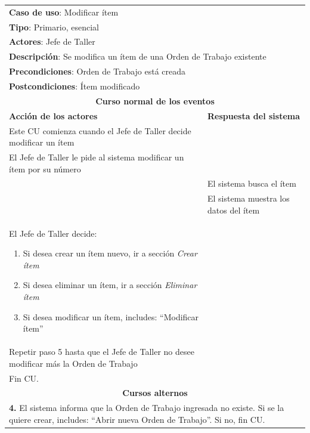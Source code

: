 \documentclass[12pt]{extarticle}
\begin{document}
\begin{spacing}{1.2}
	\begin{longtable}{ |p{8cm}|p{8cm}| }
		\hline
		\multicolumn{2}{|p{16cm}|}{\textbf{Caso de uso}: Modificar ítem}\\
		\multicolumn{2}{|p{16cm}|}{\textbf{Tipo}: Primario, esencial}\\
		\multicolumn{2}{|p{16cm}|}{\textbf{Actores}: Jefe de Taller}\\
		\multicolumn{2}{|p{16cm}|}{\textbf{Descripción}: Se modifica un ítem de una Orden de Trabajo existente}\\
		\multicolumn{2}{|p{16cm}|}{\textbf{Precondiciones}: Orden de Trabajo está creada}\\
		\multicolumn{2}{|p{16cm}|}{\textbf{Postcondiciones}: Ítem modificado}\\
		\hline
		\multicolumn{2}{|c|}{\textbf{Curso normal de los eventos}}\\
		\hline
		\textbf{Acción de los actores} & \textbf{Respuesta del sistema}\\
		\hline
			\inc Este CU comienza cuando el Jefe de Taller decide modificar un ítem& \\
			\hline
			\inc El Jefe de Taller le pide al sistema modificar un ítem por su número& \\
			\hline
			& \inc El sistema busca el ítem \\
			\hline
			& \inc El sistema muestra los datos del ítem\\
			\hline
			\inc El Jefe de Taller decide:
            \begin{enumerate}[label=(\alph*)]
                \item Si desea crear un ítem nuevo, ir a sección \textit{Crear ítem}
                \item Si desea eliminar un ítem, ir a sección \textit{Eliminar ítem}
                \item Si desea modificar un ítem, includes: ``Modificar ítem'' 
            \end{enumerate}        & \\
			\hline
			\inc  Repetir paso 5 hasta que el Jefe de Taller no desee modificar más la Orden de Trabajo& \\
			\hline
			\inc Fin CU. & \\
		\hline
		\multicolumn{2}{|c|}{\textbf{Cursos alternos}}\\
		\hline
        \multicolumn{2}{|p{16cm}|}{\textbf{4. }El sistema informa que la Orden de Trabajo ingresada no existe. Si se la quiere crear, includes: ``Abrir nueva Orden de Trabajo''. Si no, fin CU.}\\
		\hline
	\end{longtable}

    \setcounter{step}{0}











	\end{spacing}
\end{document}
